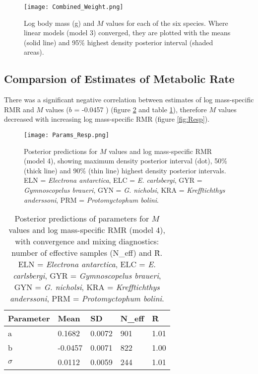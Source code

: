\documentclass[12pt, titlepage]{article}
\begin{document}
\begin{figure}[H]
\texttt{[image: Combined\_Weight.png]}
\caption{Log body mass (g) and $M$ values for each of the six species. Where linear models (model 3) converged, they are plotted with the means (solid line) and 95\% highest density posterior interval (shaded areas).}
\label{fig:SppW}
\end{figure}

\subsection{Comparsion of Estimates of Metabolic Rate}

There was a significant negative correlation between estimates of log mass-specific RMR and $M$ values ($b$ = -0.0457 ) (figure \ref{fig:ParamsResp} and table \ref{tab:Resp}), therefore $M$ values decreased with increasing log mass-specific RMR (figure \ref{fig:Resp}).

\begin{figure}[H]
\texttt{[image: Params\_Resp.png]}
\caption{Posterior predictions for $M$ values and log mass-specific RMR (model 4), showing maximum density posterior interval (dot), 50\% (thick line) and 90\% (thin line) highest density posterior intervals. ELN = \textit{Electrona antarctica}, ELC = \textit{E. carlsbergi}, GYR = \textit{Gymnoscopelus braueri}, GYN = \textit{G. nicholsi}, KRA = \textit{Krefftichthys anderssoni}, PRM = \textit{Protomyctophum bolini}.}
\label{fig:ParamsResp}
\end{figure}

\begin{table}[H]
\begin{center}
\caption{Posterior predictions of parameters for $M$ values and log mass-specific RMR (model 4), with convergence and mixing diagnostics: number of effective samples (N\_eff) and \^R. ELN = \textit{Electrona antarctica}, ELC = \textit{E. carlsbergi}, GYR = \textit{Gymnoscopelus braueri}, GYN = \textit{G. nicholsi}, KRA = \textit{Krefftichthys anderssoni}, PRM = \textit{Protomyctophum bolini}.}
\label{tab:Resp}

\def\arraystretch{1.5}
  \begin{tabular}{ | l | l | l | l | l |}
    \hline
    \textbf{Parameter} & Mean & SD & N\_eff & \^R \\ \hline
    a & 0.1682 & 0.0072 & 901 & 1.01 \\ \hline
    b & -0.0457 & 0.0071 & 822 & 1.00 \\ \hline
    $\sigma$ & 0.0112 & 0.0059 & 244 & 1.01 \\
    \hline
  \end{tabular}
  \end{center}
\end{table}
\end{document}
